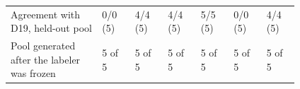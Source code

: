 \begin{table}[t]
\begin{tabular}{p{0.25\linewidth}p{0.093\linewidth}p{0.093\linewidth}p{0.093\linewidth}p{0.093\linewidth}p{0.093\linewidth}p{0.093\linewidth}}
\raggedright\hspace{0pt}Agreement with D19, held-out pool & \raggedright\hspace{0pt}0/0 (5) & \raggedright\hspace{0pt}4/4 (5) & \raggedright\hspace{0pt}4/4 (5) & \raggedright\hspace{0pt}5/5 (5) & \raggedright\hspace{0pt}0/0 (5) & \raggedright\hspace{0pt}4/4 (5) \tabularnewline
\raggedright\hspace{0pt}Pool generated after the labeler was frozen & \raggedright\hspace{0pt}5 of 5 & \raggedright\hspace{0pt}5 of 5 & \raggedright\hspace{0pt}5 of 5 & \raggedright\hspace{0pt}5 of 5 & \raggedright\hspace{0pt}5 of 5 & \raggedright\hspace{0pt}5 of 5 \tabularnewline
\bottomrule\end{tabular}\end{table}
